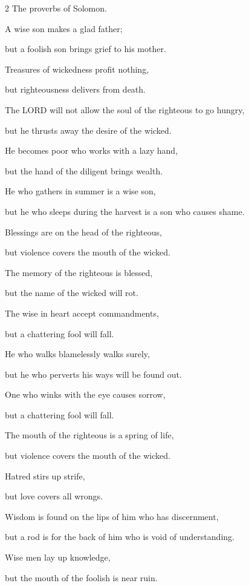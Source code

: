 \begin{multicols}{2}
\mychapter{} \myverse*{}The proverbs of Solomon.

\quad\quad A wise son makes a glad father;

but a foolish son brings grief to his mother.


\myverse{}Treasures of wickedness profit nothing,

but righteousness delivers from death.


\myverse{}The LORD will not allow the soul of the righteous to go hungry,

but he thrusts away the desire of the wicked.


\myverse{}He becomes poor who works with a lazy hand,

but the hand of the diligent brings wealth.


\myverse{}He who gathers in summer is a wise son,

but he who sleeps during the harvest is a son who causes shame.


\myverse{}Blessings are on the head of the righteous,

but violence covers the mouth of the wicked.


\myverse{}The memory of the righteous is blessed,

but the name of the wicked will rot.


\myverse{}The wise in heart accept commandments,

but a chattering fool will fall.


\myverse{}He who walks blamelessly walks surely,

but he who perverts his ways will be found out.


\myverse{}One who winks with the eye causes sorrow,

but a chattering fool will fall.


\myverse{}The mouth of the righteous is a spring of life,

but violence covers the mouth of the wicked.


\myverse{}Hatred stirs up strife,

but love covers all wrongs.


\myverse{}Wisdom is found on the lips of him who has discernment,

but a rod is for the back of him who is void of understanding.


\myverse{}Wise men lay up knowledge,

but the mouth of the foolish is near ruin.



\end{multicols}
